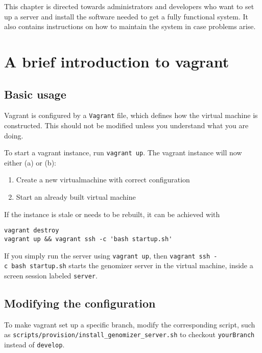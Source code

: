 This chapter is directed towards administrators and developers who want to
set up a server and install the software needed to get a fully functional system.
It also contains instructions on how to maintain the system in case problems arise.

\section{A brief introduction to
vagrant}\label{sec:a-brief-introduction-to-vagrant}

\subsection{Basic usage}\label{sec:basic-usage}

Vagrant is configured by a \texttt{Vagrant} file, which defines how the
virtual machine is constructed. This should not be modified unless you
understand what you are doing.

To start a vagrant instance, run \texttt{vagrant\ up}. The vagrant
instance will now either (a) or (b):

\begin{enumerate}
\def\labelenumi{\alph{enumi})}
\itemsep1pt\parskip0pt
\item
  Create a new virtualmachine with correct configuration
\item
  Start an already built virtual machine
\end{enumerate}

If the instance is stale or needs to be rebuilt, it can be achieved with

\begin{verbatim}
vagrant destroy
vagrant up && vagrant ssh -c 'bash startup.sh'
\end{verbatim}

If you simply run the server using \texttt{vagrant\ up}, then
\texttt{vagrant\ ssh\ -c\ \textquotesingle{}bash\ startup.sh\textquotesingle{}}
starts the genomizer server in the virtual machine, inside a screen
session labeled \texttt{server}.

\subsection{Modifying the
configuration}\label{sec:modifying-the-configuration}

To make vagrant set up a specific branch, modify the corresponding
script, such as \texttt{scripts/provision/install\_genomizer\_server.sh}
to checkout \texttt{yourBranch} instead of \texttt{develop}.

